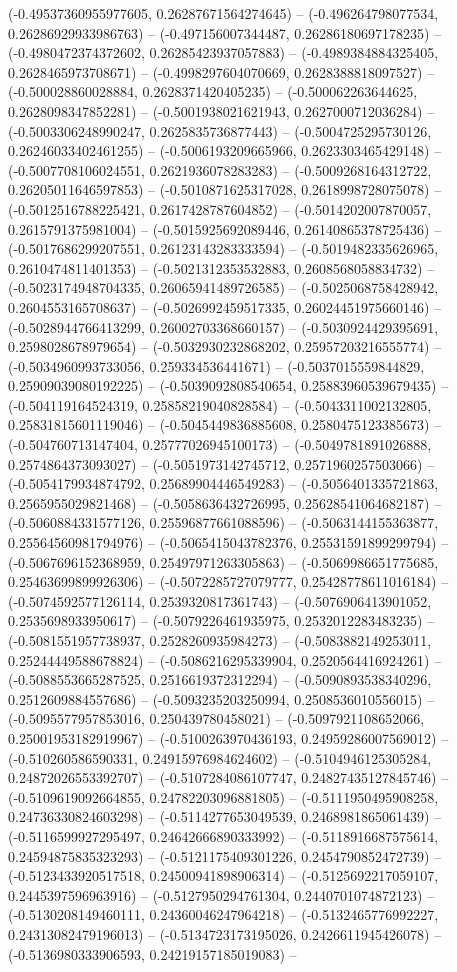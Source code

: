 (-0.49537360955977605, 0.26287671564274645) -- (-0.496264798077534, 0.26286929933986763) -- (-0.497156007344487, 0.26286180697178235) -- (-0.4980472374372602, 0.26285423937057883) -- (-0.4989384884325405, 0.2628465973708671) -- (-0.4998297604070669, 0.2628388818097527) -- (-0.500028860028884, 0.2628371420405235) -- (-0.500062263644625, 0.2628098347852281) -- (-0.5001938021621943, 0.2627000712036284) -- (-0.5003306248990247, 0.2625835736877443) -- (-0.5004725295730126, 0.26246033402461255) -- (-0.5006193209665966, 0.2623303465429148) -- (-0.5007708106024551, 0.2621936078283283) -- (-0.5009268164312722, 0.26205011646597853) -- (-0.5010871625317028, 0.2618998728075078) -- (-0.5012516788225421, 0.2617428787604852) -- (-0.5014202007870057, 0.2615791375981004) -- (-0.5015925692089446, 0.26140865378725436) -- (-0.5017686299207551, 0.26123143283333594) -- (-0.5019482335626965, 0.2610474811401353) -- (-0.5021312353532883, 0.2608568058834732) -- (-0.5023174948704335, 0.26065941489726585) -- (-0.5025068758428942, 0.2604553165708637) -- (-0.5026992459517335, 0.26024451975660146) -- (-0.5028944766413299, 0.26002703368660157) -- (-0.5030924429395691, 0.2598028678979654) -- (-0.5032930232868202, 0.25957203216555774) -- (-0.5034960993733056, 0.259334536441671) -- (-0.5037015559844829, 0.25909039080192225) -- (-0.5039092808540654, 0.25883960539679435) -- (-0.504119164524319, 0.25858219040828584) -- (-0.5043311002132805, 0.25831815601119046) -- (-0.5045449836885608, 0.2580475123385673) -- (-0.504760713147404, 0.25777026945100173) -- (-0.5049781891026888, 0.2574864373093027) -- (-0.5051973142745712, 0.2571960257503066) -- (-0.5054179934874792, 0.25689904446549283) -- (-0.5056401335721863, 0.2565955029821468) -- (-0.5058636432726995, 0.25628541064682187) -- (-0.5060884331577126, 0.25596877661088596) -- (-0.5063144155363877, 0.25564560981794976) -- (-0.5065415043782376, 0.25531591899299794) -- (-0.5067696152368959, 0.25497971263305863) -- (-0.5069986651775685, 0.25463699899926306) -- (-0.5072285727079777, 0.25428778611016184) -- (-0.5074592577126114, 0.2539320817361743) -- (-0.5076906413901052, 0.2535698933950617) -- (-0.5079226461935975, 0.2532012283483235) -- (-0.5081551957738937, 0.2528260935984273) -- (-0.5083882149253011, 0.25244449588678824) -- (-0.5086216295339904, 0.2520564416924261) -- (-0.5088553665287525, 0.2516619372312294) -- (-0.5090893538340296, 0.2512609884557686) -- (-0.5093235203250994, 0.2508536010556015) -- (-0.5095577957853016, 0.250439780458021) -- (-0.5097921108652066, 0.25001953182919967) -- (-0.5100263970436193, 0.24959286007569012) -- (-0.510260586590331, 0.24915976984624602) -- (-0.5104946125305284, 0.24872026553392707) -- (-0.5107284086107747, 0.24827435127845746) -- (-0.5109619092664855, 0.24782203096881805) -- (-0.5111950495908258, 0.24736330824603298) -- (-0.5114277653049539, 0.2468981865061439) -- (-0.5116599927295497, 0.24642666890333992) -- (-0.5118916687575614, 0.24594875835323293) -- (-0.5121175409301226, 0.2454790852472739) -- (-0.5123433920517518, 0.24500941898906314) -- (-0.5125692217059107, 0.2445397596963916) -- (-0.5127950294761304, 0.2440701074872123) -- (-0.5130208149460111, 0.24360046247964218) -- (-0.5132465776992227, 0.24313082479196013) -- (-0.5134723173195026, 0.2426611945426078) -- (-0.5136980333906593, 0.24219157185019083) -- 
